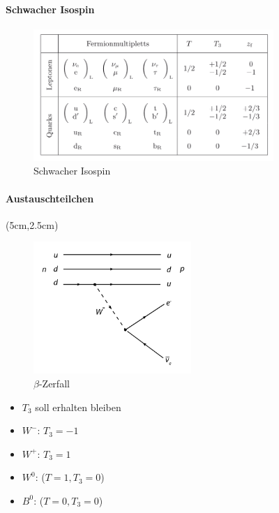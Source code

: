 \begin{nframe}
	\framesubtitle{Schwacher Isospin}
	\begin{figure}
		\includegraphics[height=5cm]{img/isospin}
		\caption*{Schwacher Isospin\cite{povh}}
	\end{figure}
\end{nframe}
\notes

\begin{iframe}


	\framesubtitle{Austauschteilchen}
	\begin{textblock*}{7cm}(5cm,2.5cm) %
		\begin{figure}
		\includegraphics[height=5cm]{img/betadecay}
		\caption*{$\beta$-Zerfall\cite{beta}}
	\end{figure}
	\end{textblock*}
	\begin{itemize}
		\pause
		\item $T_3$ soll erhalten bleiben
		\pause
		\item $W^-$: $T_3=-1$
		\pause
		\item $W^+$: $T_3=1$
		\pause
		\item $W^0$: ($T=1,T_3=0$)
		\item $B^0$: ($T=0,T_3=0$)
	\end{itemize}

\end{iframe}

